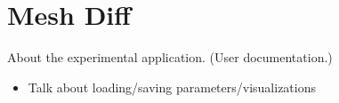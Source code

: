 \chapter{Mesh Diff}

About the experimental application. (User documentation.)

\begin{itemize}
\item Talk about loading/saving parameters/visualizations
\end{itemize}